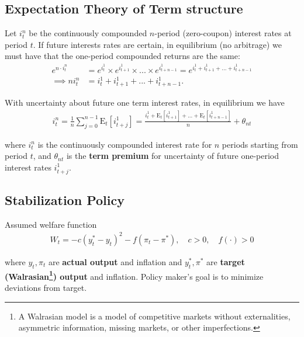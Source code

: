 \documentclass{article}
\newcommand{\Et}[1]{\mathrm{E}_t\left[#1\right]}
\newcommand{\?}{\textcolor{red}{(?)}} %
\begin{document}
    \subsection{Expectation Theory of Term structure}
        
        Let $i_t^n$ be the continuously compounded $n$-period (zero-coupon) interest rates at period $t$. If future interests rates are certain, in equilibrium (no arbitrage) we must have that the one-period compounded returns are the same:
        \begin{align}
            e^{n \cdot i_t^n }
            &= e^{i_t^1 } \times e^{i_{t + 1}^1 } \times ... \times e^{i_{t + n - 1}^1 }
            = e^{i_t^1 + i_{t + 1}^1 + ... + i_{t + n - 1}^1 }
            \\
            \implies
            n i_t^n &= i^1_{t} + i^1_{t+1} + ... + i^1_{t+n-1}.
        \end{align}
        
        With uncertainty about future one term interest rates, in equilibrium we have
        \begin{align}
            i^{n}_t
            = \frac{1}{n} \sum_{j=0}^{n-1} \Et{i^1_{t+j}}
            = \frac{i^1_t + \Et{i^1_{t+1}} + ... + \Et{i^1_{t+n-1}}}{n} + \theta_{nt}
        \end{align}
        
        where $i_t^n$ is the continuously compounded interest rate for $n$ periods starting from period $t$,  and $\theta_{nt}$ is the \textbf{term premium} for uncertainty of future one-period interest rates $i^1_{t+j}$.
        
    \subsection{Stabilization Policy}
    
        Assumed welfare function
        \begin{align}
            W_t = - c(y^*_t - y_t)^2  - f(\pi_t - \pi^*),
            \quad c > 0, \quad f(\cdot) > 0
        \end{align}
        
        where $y_t, \pi_t$ are \textbf{actual output} and inflation and $y^*_t, \pi^*$ are \textbf{target (Walrasian\footnote{A Walrasian model is a model of competitive markets without externalities, asymmetric information, missing markets, or other imperfections.}) output} and inflation. Policy maker's goal is to minimize deviations from target. \\
        
\end{document}
